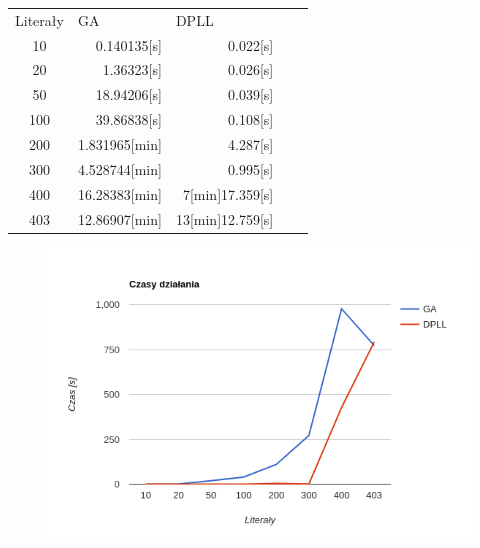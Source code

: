 \documentclass[11pt]{article}
\theoremstyle{note}
\begin{document}
\begin{tabular}{c|r|rll}
Literały & \multicolumn{1}{l|}{GA} & \multicolumn{1}{l}{DPLL} &  &  \\ \cline{1-3}
10       & 0.140135[s]              &           0.022[s]               &  &  \\
20       & 1.36323[s]                &                 0.026[s]        &  &  \\
50       & 18.94206[s]               &                         0.039[s] &  & \\
100      & 39.86838[s]                &           0.108[s]               &  &  \\
200      & 1.831965[min]                &               4.287[s]           &  &  \\
300      & 4.528744[min]                &              0.995[s]            &  &  \\
400      & 16.28383[min]                &               7[min]17.359[s]           &  &  \\
403      & 12.86907[min]                &                 13[min]12.759[s]         &  &  
\end{tabular}

\begin{figure}[htp]
\includegraphics[scale=0.64]{graph1.png}
\end{figure}
\end{document}
